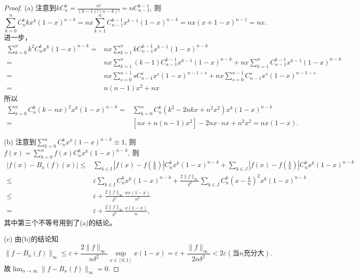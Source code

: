 \documentclass[a4paper,8pt]{ctexart}\textwidth 140mm \textheight 216mm
\newcommand{\e}{\varepsilon}
\newcommand{\8}{\infty}
\begin{document}
\begin{proof}
	(a) 注意到$kC_n^k=\frac{n!}{(k-1)!(n-k)!}=nC_{n-1}^{k-1}$, 则
	\begin{equation*}
		\sum_{k=0}^n C_n^kkx^k(1-x)^{n-k}=nx\sum_{k=1}^n C_{n-1}^{k-1}x^{k-1}(1-x)^{n-k}=nx(x+1-x)^{n-1}=nx.
	\end{equation*}
	进一步，
	\begin{equation*}
		\begin{split}
		\sum_{k=0}^n k^2C_n^kx^k(1-x)^{n-k}=&nx\sum_{k=1}^n kC_{n-1}^{k-1}x^{k-1}(1-x)^{n-k}\\
		=&nx\sum_{k=1}^n(k-1)C_{n-1}^{k-1}x^{k-1}(1-x)^{n-k}+nx\sum_{k=1}^nC_{n-1}^{k-1}x^{k-1}(1-x)^{n-k}\\
		=&nx\sum_{s=0}^{n-1}sC_{n-1}^sx^s(1-x)^{n-1-s}+nx\sum_{s=0}^{n-1}C_{n-1}^sx^s(1-x)^{n-1-s}\\
		=&n(n-1)x^2+nx
		\end{split}
	\end{equation*}
	所以
	\begin{equation*}
		\begin{split}
		\sum_{k=0}^n C_n^k(k-nx)^2x^k(1-x)^{n-k}=&\sum_{k=0}^n C_n^k(k^2-2nkx+n^2x^2)x^k(1-x)^{n-k}\\
		=&[nx+n(n-1)x^2]-2nx\cdot nx+n^2x^2=nx(1-x).
		\end{split}
	\end{equation*}
	
	(b) 注意到$\sum_{k=0}^nC_n^kx^k(1-x)^{n-k}\equiv1$, 则$f(x)=\sum_{k=0}^nf(x)C_n^kx^k(1-x)^{n-k}$, 则
	\begin{equation*}
		\begin{split}
		|f(x)-B_n(f)(x)|\leq&\sum_{k\in I}\left|f(x)-f\left(\frac{k}{n}\right)\right|C_n^kx^k(1-x)^{n-k}+\sum_{k\in J}\left|f(x)-f\left(\frac{k}{n}\right)\right|C_n^kx^k(1-x)^{n-k}\\
		\leq &\e\sum_{k\in I}C_n^kx^k(1-x)^{n-k}+\frac{2\|f\|_\infty}{\delta^2}\sum_{k\in J}C_n^k\left(x-\frac{k}{n}\right)^2x^k(1-x)^{n-k}\\
		\leq& \e+\frac{2\|f\|_\infty}{\delta^2}\frac{nx(1-x)}{n^2}\\
		=&\e+\frac{2\|f\|_\infty}{\delta^2}\frac{x(1-x)}{n},
		\end{split}
	\end{equation*}
	其中第三个不等号用到了(a)的结论。
	
	(c) 由(b)的结论知
	\begin{equation*}
		\|f-B_n(f)\|_\infty\leq \e+\frac{2\|f\|_\infty}{n\delta^2}\sup_{x\in[0,1]}x(1-x)=\e+\frac{\|f\|_\infty}{2n\delta^2}<2\e(当n\mbox{充分大}).
	\end{equation*}
	故$\lim_{n\to\infty}\|f-B_n(f)\|_\infty=0$.
	

\end{proof}
\end{document}
